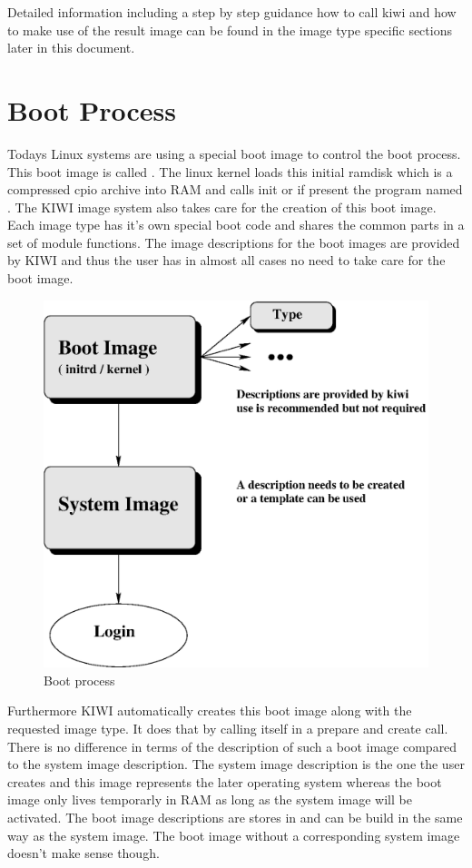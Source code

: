 Detailed information including a step by step guidance how to call
kiwi and how to make use of the result image can be found in the image
type specific sections later in this document.

\section{Boot Process}
Todays Linux systems are using a special boot image to control the
boot process. This boot image is called . The linux
kernel loads this initial ramdisk which is a compressed cpio archive
into RAM and calls init or if present the program named . The
KIWI image system also takes care for the creation of this boot image.
Each image type has it's own special boot code and shares the common
parts in a set of module functions. The image descriptions for the
boot images are provided by KIWI and thus the user has in almost all
cases no need to take care for the boot image.

\begin{figure}[h]
\centering
\includegraphics[scale=0.5]{pictures/activation.eps}
\caption{Boot process}
\label{fig:initrd}
\end{figure}

Furthermore KIWI automatically creates this boot image along with
the requested image type. It does that by calling itself in a prepare
and create call. There is no difference in terms of the description
of such a boot image compared to the system image description. The
system image description is the one the user creates and this image
represents the later operating system whereas the boot image only
lives temporarly in RAM as long as the system image will be activated.
The boot image descriptions are stores in 
and can be build in the same way as the system image. The boot image
without a corresponding system image doesn't make sense though.

